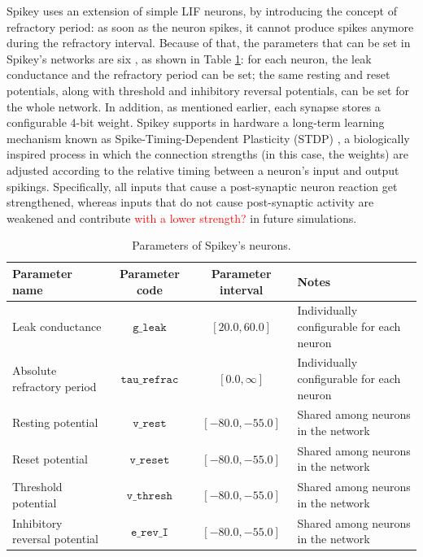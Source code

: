 \documentclass[utf8]{frontiersFPHY} %
\begin{document}
Spikey uses an extension of simple LIF neurons, by introducing the concept  of refractory period: as soon as the neuron spikes, it cannot produce  spikes anymore during the refractory interval. 
Because of that, 
the parameters that can be set in Spikey's networks are six \cite{Pfeil2013}, as shown in Table \ref{tab:parameters}: for each neuron, the leak conductance and the refractory period can be set; the same resting and reset potentials, along with threshold and inhibitory reversal potentials, can be set for the whole network. 
In addition, as mentioned earlier, each synapse stores a configurable 4-bit weight.
Spikey supports in hardware a long-term learning mechanism known as Spike-Timing-Dependent Plasticity (STDP) \cite{schemmel2006implementing}, a biologically inspired process in which the connection strengths (in this case, the weights) are adjusted according to the relative timing between a neuron's input and output spikings.
Specifically, all inputs that cause a post-synaptic neuron reaction get strengthened, whereas inputs that do not cause post-synaptic activity are weakened and contribute \textcolor{red}{with a lower strength?} in future simulations.

\begin{table}[htbp]
	\caption{Parameters of Spikey's neurons.}

	\label{tab:parameters}

	\centering
	\small
	\begin{tabularx}{\textwidth}{l|c|c|X}
	\hline
	\textbf{Parameter name}  & \textbf{Parameter code} & \textbf{Parameter interval} & \textbf{Notes} \\
	\hline
	\hline
		Leak conductance	 & $\texttt{g\_leak}$ &  $[20.0, 60.0]$ & Individually configurable for each neuron \\
	\hline
		Absolute refractory period	 & $\texttt{tau\_refrac}$ &  $[0.0, \infty]$ & Individually configurable for each neuron \\
	\hline
		Resting potential 	&  $\texttt{v\_rest}$ & 	$[-80.0, -55.0]$ &	Shared among neurons in the network\\
	\hline
		Reset potential 	&  $\texttt{v\_reset}$ & 	$[-80.0, -55.0]$ &	Shared among neurons in the network\\
	\hline
		Threshold potential 	&  $\texttt{v\_thresh}$ & 	$[-80.0, -55.0]$ &	Shared among neurons in the network\\
	\hline
		Inhibitory reversal potential 	&  $\texttt{e\_rev\_I}$ & $[-80.0, -55.0]$ &	Shared among neurons in the network\\
	\hline

	\end{tabularx}
\end{table}
\end{document}
